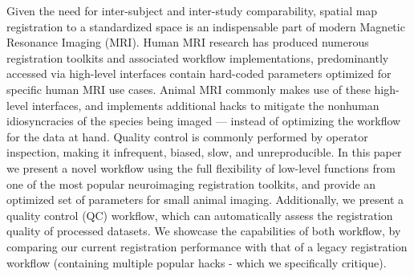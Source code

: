 Given the need for inter-subject and inter-study comparability, spatial map registration to a standardized space is an indispensable part of modern Magnetic Resonance Imaging (MRI).
Human MRI research has produced numerous registration toolkits and associated workflow implementations, predominantly accessed via high-level interfaces contain hard-coded parameters optimized for specific human MRI use cases.
Animal MRI commonly makes use of these high-level interfaces, and implements additional hacks to mitigate the nonhuman idiosyncracies of the species being imaged --- instead of optimizing the workflow for the data at hand.
Quality control is commonly performed by operator inspection, making it infrequent, biased, slow, and unreproducible.
In this paper we present a novel workflow using the full flexibility of low-level functions from one of the most popular neuroimaging registration toolkits, and provide an optimized set of parameters for small animal imaging.
Additionally, we present a quality control (QC) workflow, which can automatically assess the registration quality of processed datasets.
We showcase the capabilities of both workflow, by comparing our current registration performance with that of a legacy registration workflow (containing multiple popular hacks - which we specifically critique).
